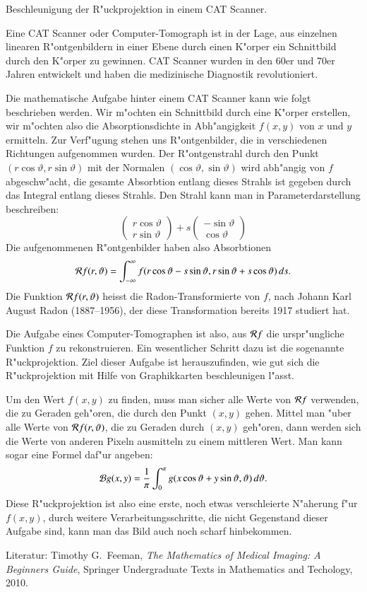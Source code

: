 \begin{aufgabe}
Beschleunigung der R"uckprojektion in einem CAT Scanner.
\end{aufgabe}

Eine CAT Scanner oder Computer-Tomograph ist in der Lage, aus
einzelnen linearen R"ontgenbildern in einer Ebene durch einen
K"orper ein Schnittbild durch den K"orper zu gewinnen.
CAT Scanner wurden in den 60er und 70er Jahren entwickelt
und haben die medizinische Diagnostik revolutioniert. 

Die mathematische Aufgabe hinter einem CAT Scanner kann wie folgt
beschrieben werden.
Wir m"ochten ein Schnittbild durch eine K"orper erstellen,
wir m"ochten also die Absorptionsdichte in Abh"angigkeit $f(x,y)$ von 
$x$ und $y$ ermitteln.
Zur Verf"ugung stehen uns R"ontgenbilder, die in verschiedenen Richtungen
aufgenommen wurden.
Der R"ontgenstrahl durch den Punkt $(r\cos\vartheta, r\sin\vartheta)$
mit der Normalen $(\cos\vartheta,\sin\vartheta)$ wird abh"angig
von $f$ abgeschw"acht, die 
gesamte Absorbtion entlang dieses Strahls ist gegeben durch das
Integral entlang dieses Strahls.
Den Strahl kann man in Parameterdarstellung beschreiben:
\[
\begin{pmatrix}
r\cos\vartheta\\
r\sin\vartheta
\end{pmatrix}
+s
\begin{pmatrix}
-\sin\vartheta\\
\cos\vartheta
\end{pmatrix}
\]
Die aufgenommenen R"ontgenbilder haben also Absorbtionen
\[
{\cal R}f(r,\vartheta)=\int_{-\infty}^{\infty}
f(r\cos\vartheta-s\sin\vartheta, r\sin\vartheta+s\cos\vartheta)\,ds.
\]
Die Funktion ${\cal R}f(r,\vartheta)$ heisst die Radon-Transformierte
von $f$, nach Johann Karl August Radon (1887--1956), der diese Transformation
bereits 1917 studiert hat.

Die Aufgabe eines Computer-Tomographen ist also, aus ${\cal R}f$ die
urspr"ungliche Funktion $f$ zu rekonstruieren.
Ein wesentlicher Schritt dazu ist die sogenannte R"uckprojektion.
Ziel dieser Aufgabe ist herauszufinden, wie gut sich die R"uckprojektion
mit Hilfe von Graphikkarten beschleunigen l"asst.

Um den Wert $f(x,y)$ zu finden, muss man sicher alle Werte von ${\cal R}f$
verwenden, die zu Geraden geh"oren, die durch den Punkt $(x,y)$ gehen.
Mittel man "uber alle Werte von ${\cal R}f(r,\vartheta)$, die zu 
Geraden durch $(x,y)$ geh"oren, dann werden sich die Werte von anderen
Pixeln ausmitteln zu einem mittleren Wert. Man kann sogar eine
Formel daf"ur angeben:
\[
{\cal B}g(x,y)
=
\frac1\pi\int_0^\pi g(x\cos\vartheta+y\sin\vartheta,\vartheta)\,d\vartheta.
\]
Diese R"uckprojektion ist also eine erste, noch etwas verschleierte
N"aherung f"ur $f(x,y)$, durch weitere Verarbeitungsschritte, die
nicht Gegenstand dieser Aufgabe sind, kann man das Bild auch noch
scharf hinbekommen.

Literatur: Timothy G.~Feeman, {\it The Mathematics of Medical Imaging:
A Beginners Guide}, Springer Undergraduate Texts in Mathematics and
Techology, 2010.

